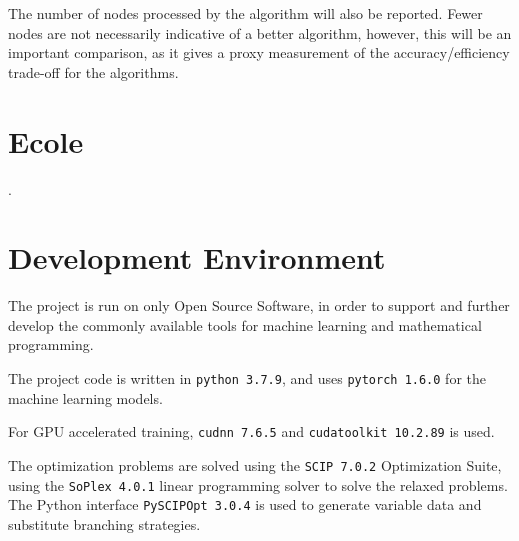 The number of nodes processed by the algorithm will also be reported. Fewer nodes are not necessarily indicative of a better algorithm, however, this will be an important comparison, as it gives a proxy measurement of the accuracy/efficiency trade-off for the algorithms. 


\section{Ecole}

\cite{prouvost2020ecole}.


\section{Development Environment}

The project is run on only Open Source Software, in order to support and further develop the commonly available tools for machine learning and mathematical programming. 

The project code is written in 
\verb|python 3.7.9|, and uses               
\verb|pytorch 1.6.0| for the machine learning models.           

For \gls{GPU} accelerated training, 
\verb|cudnn 7.6.5| and 
\verb|cudatoolkit 10.2.89| is used. 

The optimization problems are solved using the \verb|SCIP 7.0.2| Optimization Suite, using the 
\verb|SoPlex 4.0.1| linear programming solver to solve the relaxed problems. The Python interface
\verb|PySCIPOpt 3.0.4| is used to generate variable data and substitute branching strategies.
